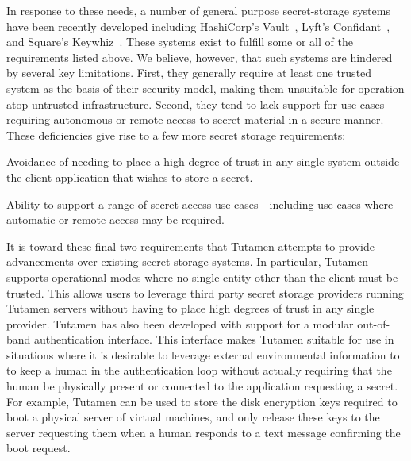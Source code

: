 In response to these needs, a number of general purpose secret-storage
systems have been recently developed including HashiCorp's
Vault~\cite{vault}, Lyft's Confidant~\cite{confidant}, and Square's
Keywhiz~\cite{keywhiz}. These systems exist to fulfill some or all of
the requirements listed above. We believe, however, that such systems
are hindered by several key limitations. First, they generally require
at least one trusted system as the basis of their security model,
making them unsuitable for operation atop untrusted
infrastructure. Second, they tend to lack support for use cases
requiring autonomous or remote access to secret material in a secure
manner. These deficiencies give rise to a few more secret
storage requirements:

\begin{packed_item}
\item Avoidance of needing to place a high degree of trust in any
  single system outside the client application that wishes to store a
  secret.
\item Ability to support a range of secret access use-cases -
  including use cases where automatic or remote access may be required.
\end{packed_item}

It is toward these final two requirements that Tutamen attempts to
provide advancements over existing secret storage systems. In
particular, Tutamen supports operational modes where no single entity
other than the client must be trusted. This allows users to leverage
third party secret storage providers running Tutamen servers without
having to place high degrees of trust in any single provider. Tutamen
has also been developed with support for a modular out-of-band
authentication interface. This interface makes Tutamen suitable for
use in situations where it is desirable to leverage external
environmental information to to keep a human in the authentication
loop without actually requiring that the human be physically present
or connected to the application requesting a secret. For example,
Tutamen can be used to store the disk encryption keys required to boot
a physical server of virtual machines, and only release these keys to
the server requesting them when a human responds to a text message
confirming the boot request.


